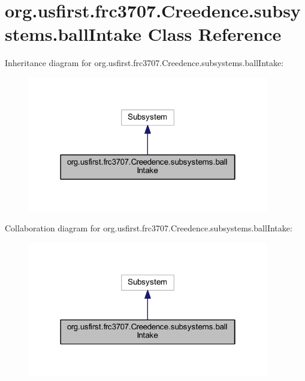 \hypertarget{classorg_1_1usfirst_1_1frc3707_1_1_creedence_1_1subsystems_1_1ball_intake}{}\section{org.\+usfirst.\+frc3707.\+Creedence.\+subsystems.\+ball\+Intake Class Reference}
\label{classorg_1_1usfirst_1_1frc3707_1_1_creedence_1_1subsystems_1_1ball_intake}


Inheritance diagram for org.\+usfirst.\+frc3707.\+Creedence.\+subsystems.\+ball\+Intake\+:
\nopagebreak
\begin{figure}[H]
\begin{center}
\leavevmode
\includegraphics[width=298pt]{classorg_1_1usfirst_1_1frc3707_1_1_creedence_1_1subsystems_1_1ball_intake__inherit__graph}
\end{center}
\end{figure}


Collaboration diagram for org.\+usfirst.\+frc3707.\+Creedence.\+subsystems.\+ball\+Intake\+:
\nopagebreak
\begin{figure}[H]
\begin{center}
\leavevmode
\includegraphics[width=298pt]{classorg_1_1usfirst_1_1frc3707_1_1_creedence_1_1subsystems_1_1ball_intake__coll__graph}
\end{center}
\end{figure}
